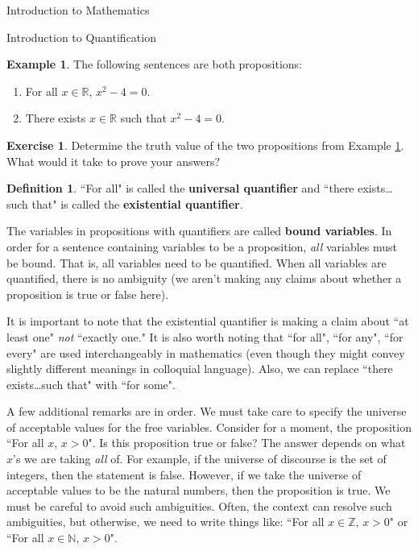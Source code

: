 \documentclass[11pt]{article}
\theoremstyle{definition}
\newtheorem{definition}[theorem]{Definition}
\newtheorem{example}[theorem]{Example}
\newtheorem{exercise}[theorem]{Exercise}
\begin{document}
\begin{section}{Introduction to Mathematics}
\begin{subsection}{Introduction to Quantification}
\begin{example}\label{ex:quantified predicates}
The following sentences are both propositions:
\begin{enumerate}
\item For all $x\in\mathbb{R}$, $x^2-4=0$.
\item There exists $x\in\mathbb{R}$ such that $x^2-4=0$.
\end{enumerate}
\end{example}

\begin{exercise}
Determine the truth value of the two propositions from Example \ref{ex:quantified predicates}.  What would it take to prove your answers?
\end{exercise}

\begin{definition}
``For all" is called the \textbf{universal quantifier} and ``there exists\ldots such that" is called the \textbf{existential quantifier}.
\end{definition}

The variables in propositions with quantifiers are called \textbf{bound variables}.  In order for a sentence containing variables to be a proposition, \emph{all} variables must be bound.  That is, all variables need to be quantified.  When all variables are quantified, there is no ambiguity (we aren't making any claims about whether a proposition is true or false here).

It is important to note that the existential quantifier is making a claim about ``at least one" \emph{not} ``exactly one."    It is also worth noting that ``for all", ``for any", ``for every" are used interchangeably in mathematics (even though they might convey slightly different meanings in colloquial language).  Also, we can replace ``there exists\ldots such that" with ``for some".

A few additional remarks are in order.  We must take care to specify the universe of acceptable values for the free variables.  Consider for a moment, the proposition ``For all $x$, $x>0$".  Is this proposition true or false?  The answer depends on what $x$'s we are taking \emph{all} of.  For example, if the universe of discourse is the set of integers, then the statement is false.  However, if we take the universe of acceptable values to be the natural numbers, then the proposition is true.  We must be careful to avoid such ambiguities.  Often, the context can resolve such ambiguities, but otherwise, we need to write things like: ``For all $x\in\mathbb{Z}$, $x>0$" or ``For all $x\in\mathbb{N}$, $x>0$".


\end{subsection}
\end{section}
\end{document}
